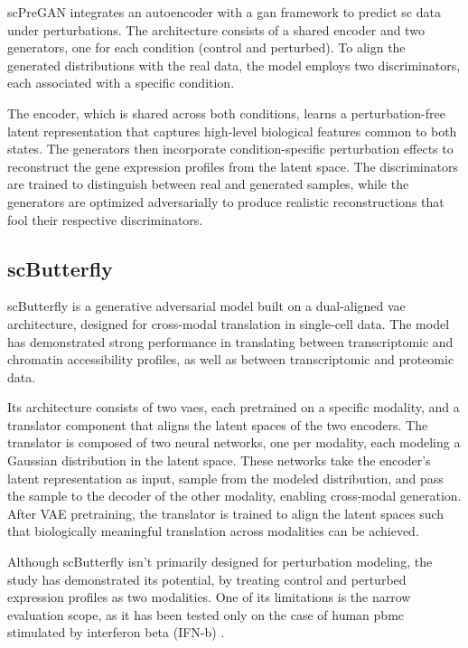 \documentclass[12pt, a4paper]{article}
\begin{document}
scPreGAN integrates an autoencoder with a \gls{gan} framework to predict \gls{sc} data under perturbations. The architecture consists of a shared encoder and two generators, one for each condition (control and perturbed). To align the generated distributions with the real data, the model employs two discriminators, each associated with a specific condition.

The encoder, which is shared across both conditions, learns a perturbation-free latent representation that captures high-level biological features common to both states. The generators then incorporate condition-specific perturbation effects to reconstruct the gene expression profiles from the latent space. The discriminators are trained to distinguish between real and generated samples, while the generators are optimized adversarially to produce realistic reconstructions that fool their respective discriminators.


\subsection{scButterfly}


scButterfly is a generative adversarial model built on a dual-aligned \gls{vae} architecture, designed for cross-modal translation in single-cell data. The model has demonstrated strong performance in translating between transcriptomic and chromatin accessibility profiles, as well as between transcriptomic and proteomic data.

Its architecture consists of two \gls{vae}s, each pretrained on a specific modality, and a translator component that aligns the latent spaces of the two encoders. The translator is composed of two neural networks, one per modality, each modeling a Gaussian distribution in the latent space. These networks take the encoder's latent representation as input, sample from the modeled distribution, and pass the sample to the decoder of the other modality, enabling cross-modal generation.
After VAE pretraining, the translator is trained to align the latent spaces such that biologically meaningful translation across modalities can be achieved.

Although scButterfly isn't primarily designed for perturbation modeling, the study has demonstrated its potential, by treating control and perturbed expression profiles as two modalities. One of its limitations is the narrow evaluation scope, as it has been tested only on the case of human \gls{pbmc} stimulated by interferon beta (IFN-b) \cite{kanaGenerativeModelingSinglecell2023}.
\end{document}
